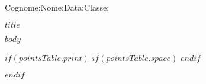 \documentclass[a4paper$if(answer)$, answers$endif$]{exam}
\begin{document}
\sffamily

Cognome:\dotfill  Nome:\dotfill  Data:\dotfill  Classe:\dotfill

\begin{minipage}[c]{\textwidth}%
    \vspace{0.2cm}
    \begin{center}
        \underline{{\LARGE $title$}}
    \end{center}

\end{minipage}%




\footskip=0.5cm
\footrule
{} {\textit{}}

\begin{questions}
    $body$
\end{questions}

$if(pointsTable.print)$
$if(pointsTable.space)$ 
\vspace{$pointsTable.space$}
$endif$
\begin{center}
    \gradetable[h][questions]
\end{center}
$endif$
\end{document}
